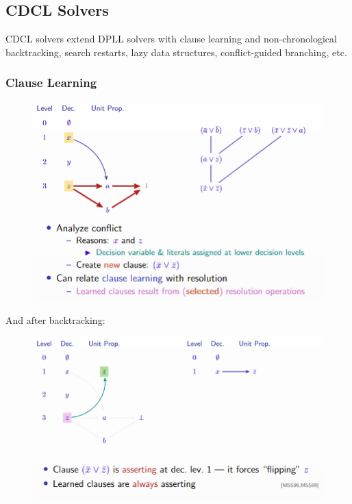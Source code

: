 \documentclass[10pt,a4paper]{report}
\begin{document}
\subsection{CDCL Solvers}
CDCL solvers extend DPLL solvers with clause learning and non-chronological backtracking, search restarts, lazy data structures, conflict-guided branching, etc.
\subsubsection{Clause Learning}
\begin{figure}[H]
    \centering
    \includegraphics[scale=0.5]{5.png}
\end{figure}
And after backtracking:
\begin{figure}[H]
    \centering
    \includegraphics[scale=0.5]{6.png}
\end{figure}
\end{document}
